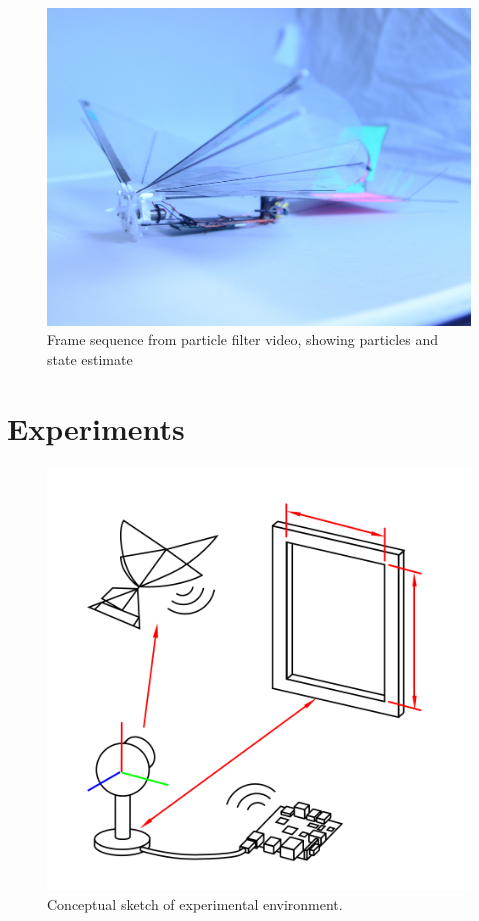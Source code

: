 \documentclass[letterpaper, 10 pt, conference]{ieeeconf}
\begin{document}
\begin{figure}[tb]
\centering
\includegraphics[width=\linewidth]{figures/h2bird.jpg}
\caption{Frame sequence from particle filter video, showing particles and state estimate}
\label{fig:pf_screencap}
\end{figure}


\section{Experiments}

\begin{figure}[tb]
\centering
\includegraphics[width=\linewidth]{figures/experiment_cartoon.png}
\caption{Conceptual sketch of experimental environment.}
\label{fig:experiment_sketch}
\end{figure}
\end{document}
